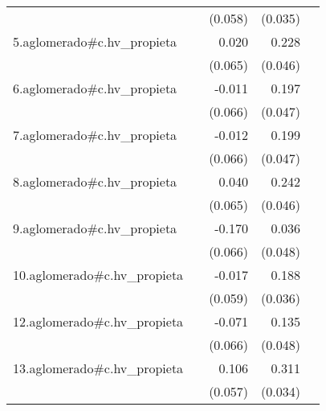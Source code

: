 {\begin{longtable}{l*{4}{D{.}{.}{-1}}}
            &                     &     (0.058)         &     (0.035)         &                     \\
\addlinespace
5.aglomerado#c.hv\_propieta&                     &       0.020         &       0.228\sym{***}&                     \\
            &                     &     (0.065)         &     (0.046)         &                     \\
\addlinespace
6.aglomerado#c.hv\_propieta&                     &      -0.011         &       0.197\sym{***}&                     \\
            &                     &     (0.066)         &     (0.047)         &                     \\
\addlinespace
7.aglomerado#c.hv\_propieta&                     &      -0.012         &       0.199\sym{***}&                     \\
            &                     &     (0.066)         &     (0.047)         &                     \\
\addlinespace
8.aglomerado#c.hv\_propieta&                     &       0.040         &       0.242\sym{***}&                     \\
            &                     &     (0.065)         &     (0.046)         &                     \\
\addlinespace
9.aglomerado#c.hv\_propieta&                     &      -0.170\sym{*}  &       0.036         &                     \\
            &                     &     (0.066)         &     (0.048)         &                     \\
\addlinespace
10.aglomerado#c.hv\_propieta&                     &      -0.017         &       0.188\sym{***}&                     \\
            &                     &     (0.059)         &     (0.036)         &                     \\
\addlinespace
12.aglomerado#c.hv\_propieta&                     &      -0.071         &       0.135\sym{**} &                     \\
            &                     &     (0.066)         &     (0.048)         &                     \\
\addlinespace
13.aglomerado#c.hv\_propieta&                     &       0.106         &       0.311\sym{***}&                     \\
            &                     &     (0.057)         &     (0.034)         &                     \\

\end{longtable}}
